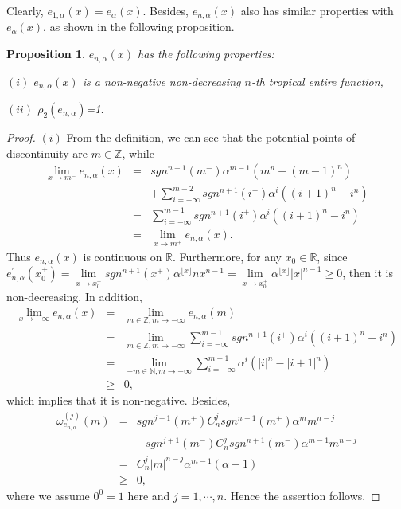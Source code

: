 \documentclass{article}
\newtheorem{proposition}[defin]{Proposition}
\begin{document}
 Clearly, $e_{1, \alpha}(x)=e_{\alpha}(x)$. Besides, $e_{n, \alpha}(x)$ also has similar properties with $e_{\alpha}(x)$, as shown in the following proposition.
\begin{proposition}\label{pro3.8}
    $e_{n,\alpha}(x)$ has the following properties:

    $(i)$ $e_{n,\alpha}(x)$ is a non-negative non-decreasing $n$-th tropical entire function,

    $(ii)$ $\rho_{2}(e_{n,\alpha})$=1.
\end{proposition}
\begin{proof}
    $(i)$ From the definition, we can see that the potential points of discontinuity are $m\in \mathbb{Z}$, while
    \begin{eqnarray*}
        \lim\limits_{x\rightarrow m^{-}}e_{n, \alpha}(x)&=&sgn^{n+1}(m^{-})\alpha^{m-1}(m^{n}-(m-1)^{n})\\
        &&+\sum_{i=-\infty}^{m-2}sgn^{n+1}(i^{+})\alpha^{i}((i+1)^{n}-i^{n})\\
        &=&\sum_{i=-\infty}^{m-1}sgn^{n+1}(i^{+})\alpha^{i}((i+1)^{n}-i^{n})\\
        &=&\lim\limits_{x\rightarrow m^{+}}e_{n, \alpha}(x).
    \end{eqnarray*}
    Thus $e_{n, \alpha}(x)$ is continuous on $\mathbb{R}$. Furthermore, for any $x_{0}\in \mathbb{R}$, since $e_{n, \alpha}^{'}(x_{0}^{+})=\lim\limits_{x\rightarrow x_{0}^{+}}sgn^{n+1}(x^{+})\alpha^{\lfloor x\rfloor}n x^{n-1}=\lim\limits_{x\rightarrow x_{0}^{+}}\alpha^{\lfloor x\rfloor}|x|^{n-1}\geq 0$, then it is non-decreasing. In addition,
    \begin{eqnarray*}
        \lim\limits_{x\rightarrow -\infty}e_{n, \alpha}(x)&=&\lim\limits_{m\in\mathbb{Z}, m\rightarrow -\infty}e_{n, \alpha}(m)\\
        &=&\lim\limits_{m\in\mathbb{Z}, m\rightarrow -\infty}\sum_{i=-\infty}^{m-1}sgn^{n+1}(i^{+})\alpha^{i}((i+1)^{n}-i^{n})\\
        &=&\lim\limits_{-m\in\mathbb{N}, m\rightarrow -\infty}\sum_{i=-\infty}^{m-1}\alpha^{i}(|i|^{n}-|i+1|^{n})\\
        &\geq& 0,
    \end{eqnarray*}
    which implies that it is non-negative. Besides,
    \begin{eqnarray}
        \omega_{e_{n, \alpha}}^{(j)}(m)&=&sgn^{j+1}(m^{+})C_{n}^{j}sgn^{n+1}(m^{+})\alpha^{m}m^{n-j}\nonumber\\
        &&-sgn^{j+1}(m^{-})C_{n}^{j}sgn^{n+1}(m^{-})\alpha^{m-1}m^{n-j}\nonumber\\
        &=&C_{n}^{j}|m|^{n-j}\alpha^{m-1}(\alpha-1)\nonumber\\
        &\geq& 0\nonumber,
    \end{eqnarray}
    where we assume $0^{0}=1$ here and $j=1, \cdots, n$. Hence the assertion follows.


\end{proof}
\end{document}
